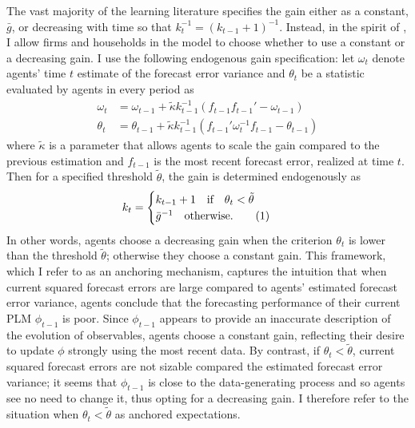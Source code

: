 \documentclass[11pt]{article}
\renewcommand{\[}{\begin{equation}}
\renewcommand{\]}{\end{equation}}
\newcommand\numberthis{\addtocounter{equation}{1}\tag{\theequation}} %
\begin{document}
The vast majority of the learning literature specifies the gain either as a constant, $\bar{g}$, or decreasing with time so that $k_t^{-1} = (k_{t-1}+1)^{-1}$. Instead, in the spirit of \cite{carvalho2019anchored}, I allow firms and households in the model to choose whether to use a constant or a decreasing gain. I use the following endogenous gain specification: let $\omega_t$ denote agents' time $t$ estimate of the forecast error variance and $\theta_t$ be a statistic evaluated by agents in every period as
\begin{align}
\omega_t & =  \omega_{t-1} + \tilde{\kappa} k_{t-1}^{-1}(f_{t-1} f_{t-1}'  -\omega_{t-1})\\
\theta_t & =  \theta_{t-1} + \tilde{\kappa} k_{t-1}^{-1}(f_{t-1}'\omega_t^{-1}f_{t-1} -\theta_{t-1}) \label{cusum_crit}
\end{align}
where $\tilde{\kappa}$ is a parameter that allows agents to scale the gain compared to the previous estimation and $f_{t-1}$ is the most recent forecast error, realized at time $t$. Then for a specified threshold $\tilde{\theta}$, the gain is determined endogenously as
\begin{align*}
k_t & = \begin{cases} k_{t-1}+1 \quad \text{if} \quad \theta_t < \tilde{\theta}  \\ \bar{g}^{-1}  \quad \text{otherwise.}\numberthis \label{anchoring}
\end{cases} 
\end{align*}
In other words, agents choose a decreasing gain when the criterion $\theta_t$ is lower than the threshold $\tilde{\theta}$; otherwise they choose a constant gain. This framework, which I refer to as an anchoring mechanism, captures the intuition that when current squared forecast errors are large compared to agents' estimated forecast error variance, agents conclude that the forecasting performance of their current PLM $\phi_{t-1}$ is poor. Since $\phi_{t-1}$ appears to provide an inaccurate description of the evolution of observables, agents choose a constant gain, reflecting their desire to update $\phi$ strongly using the most recent data. By contrast, if $\theta_t <\tilde{\theta}$, current squared forecast errors are not sizable compared the estimated forecast error variance; it seems that $\phi_{t-1}$ is close to the data-generating process and so agents see no need to change it, thus opting for a decreasing gain. I therefore refer to the situation when $\theta_t <\tilde{\theta}$ as anchored expectations.
\end{document}
